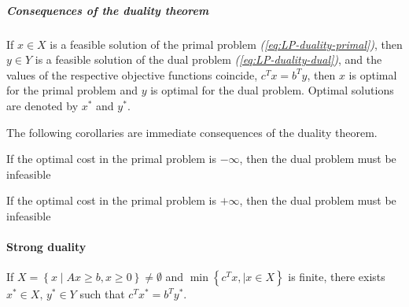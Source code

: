 \documentclass[english]{article}
\begin{document}
\subparagraph*{Consequences of the duality theorem}

If \(x \in X\) is a feasible solution of the primal problem \textit{(\ref{eq:LP-duality-primal})}, then \(y \in Y\) is a feasible solution of the dual problem \textit{(\ref{eq:LP-duality-dual})}, and the values of the respective objective functions coincide, \(c^T x = b^T y\), then \(x\) is optimal for the primal problem and \(y\) is optimal for the dual problem.
Optimal solutions are denoted by \(x^\ast\) and \(y^\ast\).

The following corollaries are immediate consequences of the duality theorem.

\begin{corollary}
  If the optimal cost in the primal problem is \(-\infty\), then the dual problem must be infeasible
\end{corollary}

\begin{corollary}
  If the optimal cost in the primal problem is \(+\infty\), then the dual problem must be infeasible
\end{corollary}

\paragraph{Strong duality}

\begin{theorem}
  If \(X = \left\{ x \mid Ax \geq b, x \geq 0 \right\} \neq \emptyset\) and \(\min\left\{ c^T x, \mid x \in X \right\}\) is finite, there exists \(x^\ast \in X, \, y^\ast \in Y\) such that \(c^T x^\ast = b^T y^\ast\).
\end{theorem}
\end{document}
